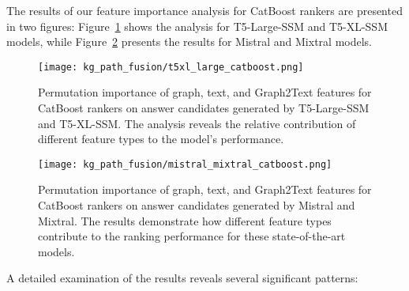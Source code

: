 The results of our feature importance analysis for CatBoost rankers are presented in two figures: Figure~\ref{fig:controllable_fusion:feature_importance_t5_large_xl_catboost} shows the analysis for T5-Large-SSM and T5-XL-SSM models, while Figure~\ref{fig:controllable_fusion:feature_importance_mis_mix_catboost} presents the results for Mistral and Mixtral models.

\begin{figure}[htb]
   \centering
   \texttt{[image: kg\_path\_fusion/t5xl\_large\_catboost.png]}
   \caption{Permutation importance of graph, text, and Graph2Text features for CatBoost rankers on answer candidates generated by T5-Large-SSM and T5-XL-SSM. The analysis reveals the relative contribution of different feature types to the model's performance.}
   \label{fig:controllable_fusion:feature_importance_t5_large_xl_catboost}
\end{figure}

\begin{figure}[htb]
   \centering
   \texttt{[image: kg\_path\_fusion/mistral\_mixtral\_catboost.png]}
   \caption{Permutation importance of graph, text, and Graph2Text features for CatBoost rankers on answer candidates generated by Mistral and Mixtral. The results demonstrate how different feature types contribute to the ranking performance for these state-of-the-art models.}
   \label{fig:controllable_fusion:feature_importance_mis_mix_catboost}
\end{figure}

A detailed examination of the results reveals several significant patterns:

